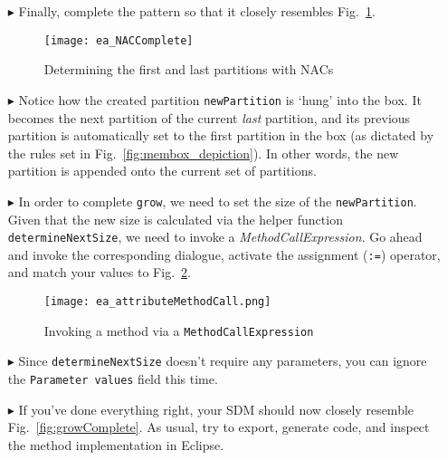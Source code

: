 \begin{itemize}
\item[$\blacktriangleright$] Finally, complete the pattern so that it closely resembles Fig.~\ref{fig:sdm_grow_3}. 

\begin{figure}[htbp]
\begin{center}
  \texttt{[image: ea\_NACComplete]} 
  \caption{Determining the first and last partitions with NACs}  
  \label{fig:sdm_grow_3}
\end{center}
\end{figure}
 
\item[$\blacktriangleright$] Notice how the created partition \texttt{newPartition} is `hung' into the box. It becomes the next partition of the current
\emph{last} partition, and its previous partition is automatically set to the first partition in the box (as dictated by the rules set in
Fig.~\ref{fig:membox_depiction}). In other words, the new partition is appended onto the current set of partitions.

\item[$\blacktriangleright$] In order to complete \texttt{grow}, we need to set the size of the \texttt{newPartition}. Given that the new size is calculated
via the helper function \texttt{det\-er\-mine\-Next\-Size}, we need to invoke a \emph{MethodCallExpression}. Go ahead and invoke the corresponding dialogue,
activate the assignment (\texttt{:=}) operator, and match your values to Fig.~\ref{fig:sdm_grow_4}.
 
\begin{figure}[htbp]
\begin{center}
  \texttt{[image: ea\_attributeMethodCall.png]}
  \caption{Invoking a method via a \texttt{MethodCallExpression}}  
  \label{fig:sdm_grow_4} 
\end{center}
\end{figure}

\item[$\blacktriangleright$] Since \texttt{determineNextSize} doesn't require any parameters, you can ignore the \texttt{Parameter values} field this time. 

\vspace{0.5cm}

\item[$\blacktriangleright$] If you've done everything right, your SDM should now closely resemble Fig.~\ref{fig:growComplete}. As usual, try to export,
generate code, and inspect the method implementation in Eclipse.


\end{itemize}
